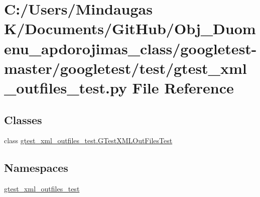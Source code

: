 \hypertarget{googletest-master_2googletest_2test_2gtest__xml__outfiles__test_8py}{}\section{C\+:/\+Users/\+Mindaugas K/\+Documents/\+Git\+Hub/\+Obj\+\_\+\+Duomenu\+\_\+apdorojimas\+\_\+class/googletest-\/master/googletest/test/gtest\+\_\+xml\+\_\+outfiles\+\_\+test.py File Reference}
\label{googletest-master_2googletest_2test_2gtest__xml__outfiles__test_8py}
\subsection*{Classes}
\begin{DoxyCompactItemize}
\item 
class \mbox{\hyperlink{classgtest__xml__outfiles__test_1_1_g_test_x_m_l_out_files_test}{gtest\+\_\+xml\+\_\+outfiles\+\_\+test.\+G\+Test\+X\+M\+L\+Out\+Files\+Test}}
\end{DoxyCompactItemize}
\subsection*{Namespaces}
\begin{DoxyCompactItemize}
\item 
 \mbox{\hyperlink{namespacegtest__xml__outfiles__test}{gtest\+\_\+xml\+\_\+outfiles\+\_\+test}}
\end{DoxyCompactItemize}
